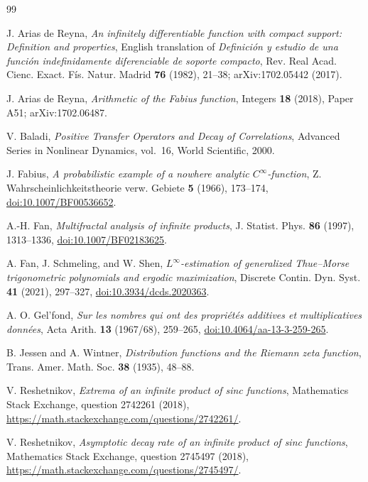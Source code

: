 \documentclass[11pt,oneside]{article}
\theoremstyle{definition}
\theoremstyle{remark}
\begin{document}
\begin{thebibliography}{99}

J. Arias de Reyna,
\emph{An infinitely differentiable function with compact support: Definition and properties},
English translation of \emph{Definici\'on y estudio de una funci\'on indefinidamente
diferenciable de soporte compacto}, Rev. Real Acad. Cienc. Exact. F\'is. Natur. Madrid
\textbf{76} (1982), 21--38; arXiv:1702.05442 (2017).

J. Arias de Reyna,
\emph{Arithmetic of the Fabius function},
Integers \textbf{18} (2018), Paper A51; arXiv:1702.06487.

V. Baladi,
\emph{Positive Transfer Operators and Decay of Correlations},
Advanced Series in Nonlinear Dynamics, vol.~16, World Scientific, 2000.

J. Fabius,
\emph{A probabilistic example of a nowhere analytic $C^\infty$-function},
Z. Wahrscheinlichkeitstheorie verw. Gebiete \textbf{5} (1966), 173--174,
\href{https://doi.org/10.1007/BF00536652}{doi:10.1007/BF00536652}.

A.-H. Fan,
\emph{Multifractal analysis of infinite products},
J. Statist. Phys. \textbf{86} (1997), 1313--1336,
\href{https://doi.org/10.1007/BF02183625}{doi:10.1007/BF02183625}.

A. Fan, J. Schmeling, and W. Shen,
\emph{$L^\infty$-estimation of generalized Thue--Morse trigonometric polynomials and
ergodic maximization},
Discrete Contin. Dyn. Syst. \textbf{41} (2021), 297--327,
\href{https://doi.org/10.3934/dcds.2020363}{doi:10.3934/dcds.2020363}.

A. O. Gel'fond,
\emph{Sur les nombres qui ont des propri\'et\'es additives et multiplicatives donn\'ees},
Acta Arith. \textbf{13} (1967/68), 259--265,
\href{https://doi.org/10.4064/aa-13-3-259-265}{doi:10.4064/aa-13-3-259-265}.

B. Jessen and A. Wintner,
\emph{Distribution functions and the Riemann zeta function},
Trans. Amer. Math. Soc. \textbf{38} (1935), 48--88.

V. Reshetnikov,
\emph{Extrema of an infinite product of sinc functions},
Mathematics Stack Exchange, question 2742261 (2018),
\url{https://math.stackexchange.com/questions/2742261/}.

V. Reshetnikov,
\emph{Asymptotic decay rate of an infinite product of sinc functions},
Mathematics Stack Exchange, question 2745497 (2018),
\url{https://math.stackexchange.com/questions/2745497/}.


\end{thebibliography}
\end{document}
